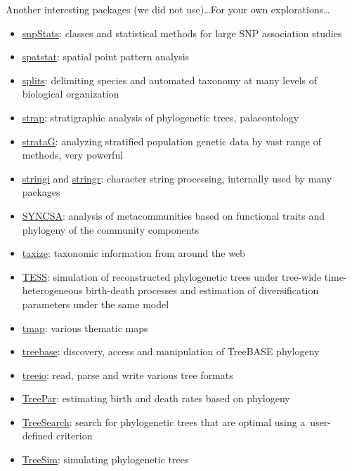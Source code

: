 \documentclass[compress, ucs, xelatex, 11pt, xcolor=svgnames, aspectratio=169,
	hyperref={
		bookmarks=true,
		unicode=true,
		colorlinks=true,
		pdftitle={Molecular data in R},
		plainpages=false,
		pdfauthor={Vojtech Zeisek},
		pdfsubject={Course about phylogeny and evolution in R},
		pdfcreator={XeLaTeX},
		pdfkeywords={R, evolution, phylogeny, molecular data},
		linkcolor=Crimson, %
		anchorcolor=Magenta, %
		citecolor=Magenta, %
		filecolor=Magenta, %
		menucolor=Magenta, %
		urlcolor=DodgerBlue, %
		pdftex},
	url={hyphens, lowtilde} %
	]{beamer}
\begin{document}
\begin{frame}[allowframebreaks]{Another interesting packages (we did not use)\ldots}{For your own explorations\ldots}
\begin{itemize}
		\item \href{https://bioconductor.org/packages/release/bioc/html/snpStats.html}{snpStats}: classes and statistical methods for large SNP association studies
		\item \href{https://CRAN.R-project.org/package=spatstat}{spatstat}: spatial point pattern analysis
		\item \href{https://r-forge.r-project.org/projects/splits/}{splits}: delimiting species and automated taxonomy at many levels of biological organization
		\item \href{https://CRAN.R-project.org/package=strap}{strap}: stratigraphic analysis of phylogenetic trees, palaeontology
		\item \href{https://github.com/cran/strataG}{strataG}: analyzing stratified population genetic data by vast range of methods, very powerful
		\item \href{https://CRAN.R-project.org/package=stringi}{stringi} and \href{https://CRAN.R-project.org/package=stringr}{stringr}: character string processing, internally used by many packages
		\item \href{https://CRAN.R-project.org/package=SYNCSA}{SYNCSA}: analysis of metacommunities based on functional traits and phylogeny of the community components
		\item \href{https://CRAN.R-project.org/package=taxize}{taxize}: taxonomic information from around the web
		\item \href{https://CRAN.R-project.org/package=TESS}{TESS}: simulation of reconstructed phylogenetic trees under tree-wide time-heterogeneous birth-death processes and estimation of diversification parameters under the same model
		\item \href{https://CRAN.R-project.org/package=tmap}{tmap}: various thematic maps
		\item \href{https://CRAN.R-project.org/package=treebase}{treebase}: discovery, access and manipulation of TreeBASE phylogeny
		\item \href{https://bioconductor.org/packages/release/bioc/html/treeio.html}{treeio}: read, parse and write various tree formats
		\item \href{https://CRAN.R-project.org/package=TreePar}{TreePar}: estimating birth and death rates based on phylogeny
		\item \href{https://CRAN.R-project.org/package=TreeSearch}{TreeSearch}: search for phylogenetic trees that are optimal using a~user-defined criterion
		\item \href{https://CRAN.R-project.org/package=TreeSim}{TreeSim}: simulating phylogenetic trees

\end{itemize}
\end{frame}
\end{document}
